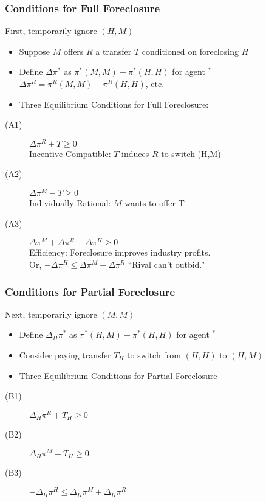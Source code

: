 \documentclass[aspectratio=169]{beamer}
\begin{document}
\begin{frame}
\frametitle{Conditions for Full Foreclosure}
First, temporarily ignore $(H,M)$
\begin{itemize}
\item Suppose $M$ offers $R$ a transfer $T$ conditioned on foreclosing $H$
\item Define $\Delta \pi^{*}$ as $\pi^*(M,M) - \pi^*(H,H)$ for agent $ ^*$ \\ 
\hspace{0.4in} $\Delta \pi^{R} = \pi^R(M,M) - \pi^R(H,H)$, etc.
\item Three Equilibrium Conditions for Full Foreclosure:
\end{itemize}
\begin{description}
\item[(A1)] $\Delta \pi^R+ T \geq 0$\\
 Incentive Compatible: $T$ induces $R$ to switch (H,M)
\item[(A2)] $\Delta \pi^M - T \geq 0$\\
Individually Rational: $M$ wants to offer T
\item[(A3)] $\Delta \pi^M + \Delta \pi^R + \Delta \pi^H \geq 0$\\
Efficiency: Foreclosure improves industry profits.\\
Or, $-\Delta\pi^H \leq \Delta \pi^M + \Delta \pi^R$ ``Rival can't outbid." 
\end{description}
\end{frame}

\begin{frame}
\frametitle{Conditions for Partial Foreclosure}
Next, temporarily ignore $(M,M)$
\begin{itemize}
\item Define $\Delta_H \pi^{*}$ as $\pi^*(H,M) - \pi^*(H,H)$ for agent $ ^*$ 
\item Consider paying transfer $T_H$ to switch from $(H,H)$ to $(H,M)$
\item Three Equilibrium Conditions for Partial Foreclosure
\end{itemize}
\begin{description}
\item[(B1)] $\Delta_H \pi^R+ T_H \geq 0$
\item[(B2)] $\Delta_H \pi^M - T_H \geq 0$
\item[(B3)]$-\Delta_H\pi^H \leq \Delta_H \pi^M + \Delta_H \pi^R$
\end{description}
\end{frame}
\end{document}
